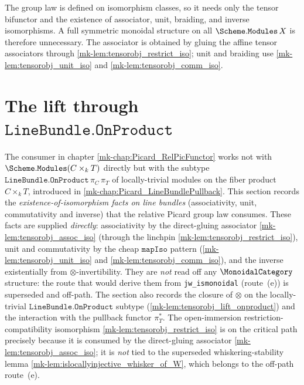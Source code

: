 \begin{remark}
  \label{mk-rem:scheme_modules_monoidal_off_path}
  The group law is defined on isomorphism classes, so it needs only the
  tensor bifunctor and the existence of associator, unit, braiding, and inverse
  isomorphisms.  A full symmetric monoidal structure on all
  \(\Scheme.\mathtt{Modules}\,X\) is therefore unnecessary.  The associator is
  obtained by gluing the affine tensor associators through
  \ref{mk-lem:tensorobj_restrict_iso}; unit and braiding use
  \ref{mk-lem:tensorobj_unit_iso} and \ref{mk-lem:tensorobj_comm_iso}.
\end{remark}

\section{The lift through \(\texttt{LineBundle.OnProduct}\)}
\label{mk-sec:tensorobj_onproduct_lift}

The consumer in chapter \ref{mk-chap:Picard_RelPicFunctor} works not with
\(\Scheme.\mathtt{Modules}(C \times_k T)\) directly but with the subtype
\(\texttt{LineBundle.OnProduct}\,\pi_C\,\pi_T\) of locally-trivial
modules on the fiber product \(C \times_k T\), introduced in
\ref{mk-chap:Picard_LineBundlePullback}. This section records the
\emph{existence-of-isomorphism facts on line bundles} (associativity, unit,
commutativity and inverse) that the relative Picard group law consumes. These facts
are supplied \emph{directly}: associativity by the direct-gluing associator
\ref{mk-lem:tensorobj_assoc_iso} (through the linchpin
\ref{mk-lem:tensorobj_restrict_iso}), unit and commutativity by the cheap
\(\mathtt{mapIso}\) pattern (\ref{mk-lem:tensorobj_unit_iso} and
\ref{mk-lem:tensorobj_comm_iso}),
and the inverse existentially from \(\otimes\)-invertibility. They are \emph{not}
read off any \(\MonoidalCategory\) structure: the route that would derive them from
\texttt{jw\_ismonoidal} (route~(e)) is superseded and off-path. The section also
records the closure of \(\otimes\) on the locally-trivial
\(\texttt{LineBundle.OnProduct}\) subtype (\ref{mk-lem:tensorobj_lift_onproduct}) and
the interaction with the pullback functor \(\pi_T^*\). The open-immersion
restriction-compatibility isomorphism \ref{mk-lem:tensorobj_restrict_iso} is on the
critical path precisely because it is consumed by the direct-gluing associator
\ref{mk-lem:tensorobj_assoc_iso}; it is \emph{not} tied to the superseded
whiskering-stability lemma \ref{mk-lem:islocallyinjective_whisker_of_W}, which belongs
to the off-path route~(e).

